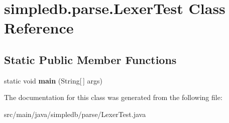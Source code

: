 \hypertarget{classsimpledb_1_1parse_1_1LexerTest}{}\section{simpledb.\+parse.\+Lexer\+Test Class Reference}
\label{classsimpledb_1_1parse_1_1LexerTest}
\subsection*{Static Public Member Functions}
\begin{DoxyCompactItemize}
\item 
\mbox{\label{classsimpledb_1_1parse_1_1LexerTest_a5e476c0d9791a7ca420ee253068f4fe8}} 
static void {\bfseries main} (String\mbox{[}$\,$\mbox{]} args)
\end{DoxyCompactItemize}


The documentation for this class was generated from the following file\+:\begin{DoxyCompactItemize}
\item 
src/main/java/simpledb/parse/Lexer\+Test.\+java\end{DoxyCompactItemize}
